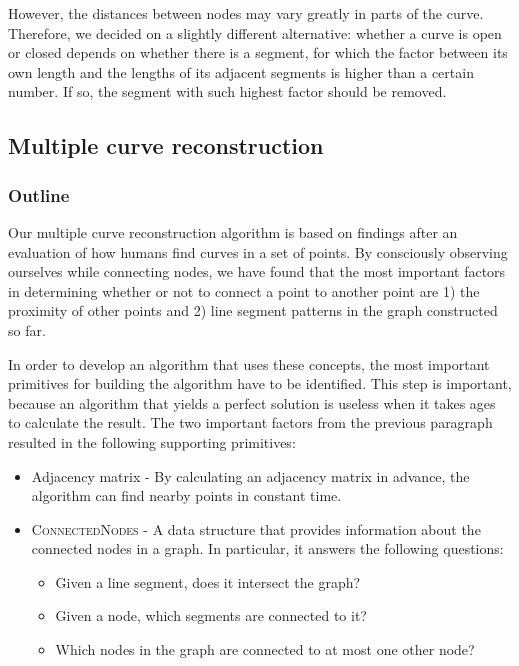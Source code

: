 \documentclass[11pt]{article}
\begin{document}
However, the distances between nodes may vary greatly in parts of the curve. Therefore, we decided on a slightly different alternative: whether a curve is open or closed depends on whether there is a segment, for which the factor between its own length and the lengths of its adjacent segments is higher than a certain number. If so, the segment with such highest factor should be removed.

\subsection{Multiple curve reconstruction}

\subsubsection{Outline}
Our multiple curve reconstruction algorithm is based on findings after an evaluation of how humans find curves in a set of points. By consciously observing ourselves while connecting nodes, we have found that the most important factors in determining whether or not to connect a point to another point are 1) the proximity of other points and 2) line segment patterns in the graph constructed so far.

In order to develop an algorithm that uses these concepts, the most important primitives for building the algorithm have to be identified. This step is important, because an algorithm that yields a perfect solution is useless when it takes ages to calculate the result. The two important factors from the previous paragraph resulted in the following supporting primitives:

\begin{itemize}
\item Adjacency matrix - By calculating an adjacency matrix in advance, the algorithm can find nearby points in constant time.
\item \textsc{ConnectedNodes} - A data structure that provides information about the connected nodes in a graph. In particular, it answers the following questions:
\begin{itemize}
\item Given a line segment, does it intersect the graph?
\item Given a node, which segments are connected to it?
\item Which nodes in the graph are connected to at most one other node?
\end{itemize}
\end{itemize}
\end{document}
